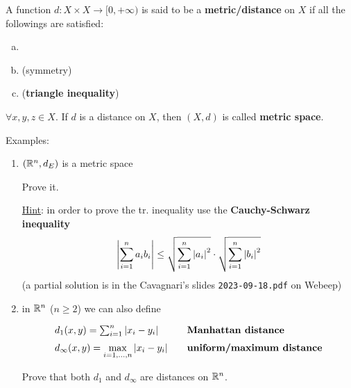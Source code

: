 \begin{defn}
A function $d:X\times X\to[0,+\infty)$ is said to be a \textbf{metric/distance} on $X$ if all the followings are satisfied:
\begin{enumerate}[(a)]
    \item {}
    \item { (symmetry)}
    \item { (\textbf{triangle inequality})}
\end{enumerate}
$\forall x,y,z\in X$. If $d$ is a distance on $X$, then $(X,d)$ is called \textbf{metric space}.
\end{defn}

Examples:
\begin{enumerate}
    \item $\left( \mathbb{R}^n,d_E \right)$ is a metric space

    \begin{home}
    Prove it.

    \underline{Hint}: in order to prove the tr. inequality use the \textbf{Cauchy-Schwarz inequality}
    \begin{equation*}
        \left\lvert \sum^{n}_{i=1}a_ib_i \right\rvert\leq\sqrt{\sum^{n}_{i=1}\left\lvert a_i \right\rvert^2 } \cdot \sqrt{\sum^{n}_{i=1}\left\lvert b_i \right\rvert^2 }
    \end{equation*}
    \newline
    \newline
    \newline
    (a partial solution is in the Cavagnari's slides \texttt{2023-09-18.pdf} on Webeep)
    \end{home}

    \item in $\mathbb{R}^n$ ($n\geq 2$) we can also define
    \begin{equation*}
    {\renewcommand*{\arraystretch}{1.5}
    \begin{array}{ll}
    d_1(x,y)=\sum^{n}_{i=1}\abs{x_i-y_i} &\quad\textbf{Manhattan distance} \\
    d_\infty(x,y)=\displaystyle\max_{i=1,...,n} \abs{x_i-y_i} &\quad\textbf{uniform/maximum distance} 
    \end{array}}
    \end{equation*}

    \begin{home}
    Prove that both $d_1$ and $d_\infty$ are distances on $\mathbb{R}^n$.


\end{home}
\end{enumerate}
